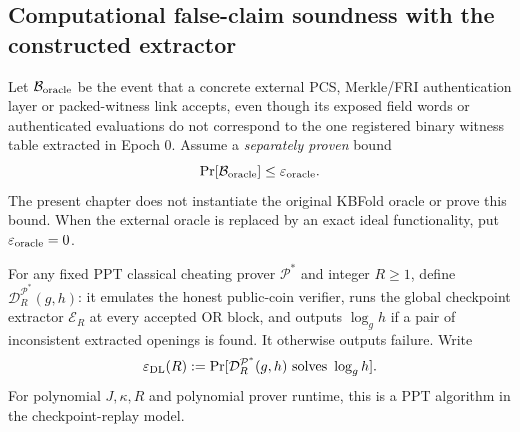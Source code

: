 \subsection{Computational false-claim soundness with the constructed extractor}\label{sec:global:soundness}

\begin{definition}\label{def:global:oracle-error}
Let $\mathcal B_{\rm oracle}$ be the event that
a concrete external PCS, Merkle/FRI authentication
layer or packed-witness link accepts, even though
its exposed field words or authenticated evaluations
do not correspond to the one registered binary
witness table extracted in Epoch 0.
Assume a \emph{separately proven} bound
\[
 \Pr[\mathcal B_{\rm oracle}]
 \le \varepsilon_{\rm oracle}.
\]
The present chapter does not instantiate
the original KBFold oracle or prove this bound.
When the external oracle is replaced by an
exact ideal functionality, put
$\varepsilon_{\rm oracle}=0$.
\end{definition}

\begin{definition}\label{def:global:dl-reduction}
For any fixed PPT classical cheating prover
$\mathcal P^*$ and integer $R\ge1$,
define $\mathcal D_R^{\mathcal P^*}(g,h)$:
it emulates the honest public-coin verifier,
runs the global checkpoint extractor
$\mathcal E_R$ at every accepted OR block,
and outputs $\log_g h$ if a pair
of inconsistent extracted openings
is found. It otherwise outputs failure.
Write
\[
 \varepsilon_{\rm DL}(R)
 :=\Pr[\mathcal D_R^{\mathcal P^*}(g,h)
     \text{ solves }\log_g h].
\]
For polynomial $J,\kappa,R$ and polynomial
prover runtime, this is a PPT algorithm
in the checkpoint-replay model.
\end{definition}

